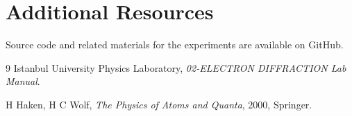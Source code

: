 \documentclass[journal]{IEEEtran}
\begin{document}
\section{Additional Resources}
Source code and related materials for the experiments are available on GitHub.

\begin{figure}[H]
    \centering
    \begin{minipage}{0.15\textwidth}
        \centering
    \end{minipage}%
\end{figure}

\begin{thebibliography}{9}
Istanbul University Physics Laboratory, 
\textit{02-ELECTRON DIFFRACTION Lab Manual}.

H Haken, H C Wolf, \textit{The Physics of Atoms and Quanta}, 2000, Springer.
\end{thebibliography}
\end{document}
